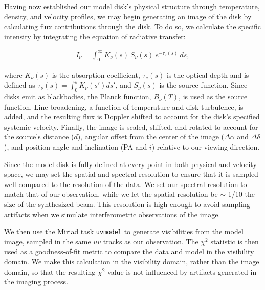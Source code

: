 Having now established our model disk's physical structure through temperature, density, and velocity profiles, we may begin generating an image of the disk by calculating flux contributions through the disk. To do so, we calculate the specific intensity by integrating the equation of radiative transfer:

\begin{align}
  I_\nu = \int_0^{\infty} K_\nu(s)\ S_\nu(s)\ e^{-\tau_\nu(s)}\ ds,
\end{align}

where $K_\nu(s)$ is the absorption coefficient, $\tau_\nu(s)$ is the optical depth and is defined as $\tau_\nu(s) = \int_0^s K_\nu(s') ds'$, and $S_\nu(s)$ is the source function. Since disks emit as blackbodies, the Planck function, $B_\nu(T)$, is used as the source function. Line broadening, a function of temperature and disk turbulence, is added, and the resulting flux is Doppler shifted to account for the disk's specified systemic velocity. Finally, the image is scaled, shifted, and rotated to account for the source's distance ($d$), angular offset from the center of the image ($\Delta \alpha$ and $\Delta \delta$), and position angle and inclination (PA and $i$) relative to our viewing direction.

Since the model disk is fully defined at every point in both physical and velocity space, we may set the spatial and spectral resolution to ensure that it is sampled well compared to the resolution of the data. We set our spectral resolution to match that of our observation, while we let the spatial resolution be $\sim$ 1/10 the size of the synthesized beam. This resolution is high enough to avoid sampling artifacts when we simulate interferometric observations of the image.


We then use the Miriad task \texttt{uvmodel} to generate visibilities from the model image, sampled in the same $uv$ tracks as our observation. The $\chi^2$ statistic is then used as a goodness-of-fit metric to compare the data and model in the visibility domain. We make this calculation in the visibility domain, rather than the image domain, so that the resulting $\chi^2$ value is not influenced by artifacts generated in the imaging process.


